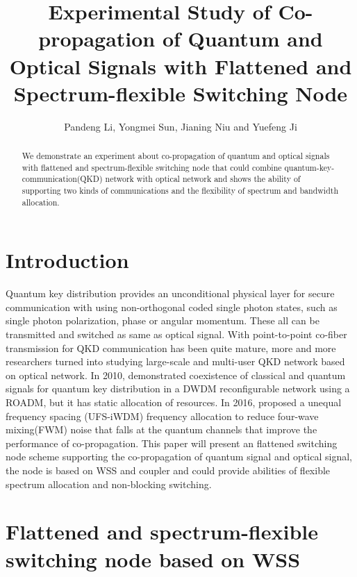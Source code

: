 \documentclass[letterpaper,10pt]{article}
\begin{document}
\title{Experimental Study of Co-propagation of Quantum and Optical Signals with Flattened and Spectrum-flexible Switching Node}
\author{Pandeng Li, Yongmei Sun, Jianing Niu and Yuefeng Ji}
\address{State Key Laboratory of Information Photonics and Optical Communications, School of Information and Telecommunication Engineering, BUPT Beijing, China, 100876}

\begin{abstract}
We demonstrate an experiment about co-propagation of quantum and optical signals with flattened and spectrum-flexible switching node that could combine quantum-key-communication(QKD) network with optical network and shows the ability of supporting two kinds of communications and the flexibility of spectrum and bandwidth allocation.
\end{abstract}

\section{Introduction}

Quantum key distribution provides an unconditional physical layer for secure communication with using non-orthogonal coded single photon states, such as single photon polarization, phase or angular momentum. These all can be transmitted and switched as same as optical signal. With point-to-point co-fiber transmission for QKD communication has been quite mature, more and more researchers turned into studying large-scale and multi-user QKD network based on optical network. In 2010, \cite{Peters} demonstrated coexistence of classical and quantum signals for quantum key distribution in a DWDM reconfigurable network using a ROADM, but it has static allocation of resources. In 2016, \cite{YongmeiSun} proposed a unequal frequency spacing (UFS-iWDM) frequency allocation to reduce four-wave mixing(FWM) noise that falls at the quantum channels that improve the performance of co-propagation. This paper will present an flattened switching node scheme supporting the co-propagation of quantum signal and optical signal, the node is based on WSS and coupler and could provide abilities of flexible spectrum allocation and non-blocking switching.

\section{Flattened and spectrum-flexible switching node based on WSS}
\end{document}
